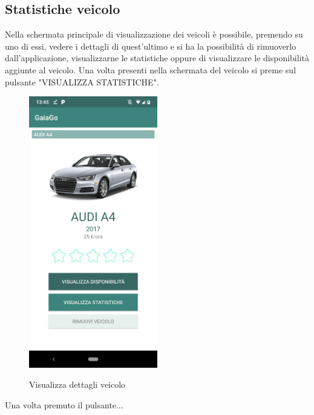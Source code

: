 \subsection{Statistiche veicolo}
Nella schermata principale di visualizzazione dei veicoli è possibile, premendo su uno di essi, vedere i dettagli di quest'ultimo e si ha la possibilità di rimuoverlo dall'applicazione, visualizzarne le statistiche oppure di visualizzare le disponibilità aggiunte al veicolo. Una volta presenti nella schermata del veicolo si preme sul pulsante "VISUALIZZA STATISTICHE".
\begin{figure}[H] 
	\centering 
	\includegraphics[width=0.5\textwidth]{res/images/visualizza_dettagli.png}\\
	\caption{Visualizza dettagli veicolo}
	\label{statistiche}
\end{figure}
\pagebreak
Una volta premuto il pulsante...
\pagebreak

